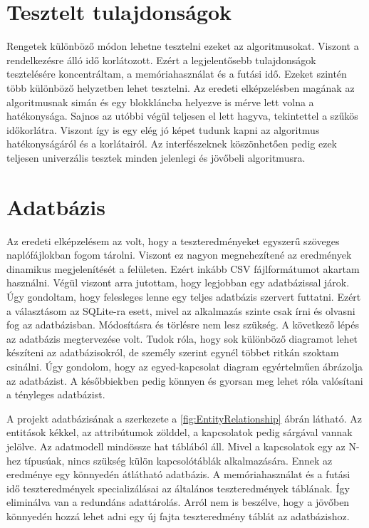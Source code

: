 \documentclass[12pt]{report} %
\begin{document}
\section{Tesztelt tulajdonságok} %

Rengetek különböző módon lehetne tesztelni ezeket az algoritmusokat. Viszont a rendelkezésre álló idő korlátozott. Ezért a legjelentősebb tulajdonságok tesztelésére koncentráltam, a memóriahasználat és a futási idő. Ezeket szintén több különböző helyzetben lehet tesztelni. Az eredeti elképzelésben magának az algoritmusnak simán és egy blokkláncba helyezve is mérve lett volna a hatékonysága. Sajnos az utóbbi végül teljesen el lett hagyva, tekintettel a szűkös időkorlátra. Viszont így is egy elég jó képet tudunk kapni az algoritmus hatékonyságáról és a korlátairól. Az interfészeknek köszönhetően pedig ezek teljesen univerzális tesztek minden jelenlegi és jövőbeli algoritmusra.

\section{Adatbázis} %

Az eredeti elképzelésem az volt, hogy a teszteredményeket egyszerű szöveges naplófájlokban fogom tárolni. Viszont ez nagyon megnehezítené az eredmények dinamikus megjelenítését a felületen. Ezért inkább CSV fájlformátumot akartam használni. Végül viszont arra jutottam, hogy legjobban egy adatbázissal járok. Úgy gondoltam, hogy felesleges lenne egy teljes adatbázis szervert futtatni. Ezért a választásom az SQLite-ra \cite{sqLite} esett, mivel az alkalmazás szinte csak írni és olvasni fog az adatbázisban. Módosításra és törlésre nem lesz szükség. A következő lépés az adatbázis megtervezése volt. Tudok róla, hogy sok különböző diagramot lehet készíteni az adatbázisokról, de személy szerint egynél többet ritkán szoktam csinálni. Úgy gondolom, hogy az egyed-kapcsolat diagram egyértelműen ábrázolja az adatbázist. A későbbiekben pedig könnyen és gyorsan meg lehet róla valósítani a tényleges adatbázist.

A projekt adatbázisának a szerkezete a \ref{fig:EntityRelationship} ábrán látható. Az entitások kékkel, az attribútumok zölddel, a kapcsolatok pedig sárgával vannak jelölve. Az adatmodell mindössze hat táblából áll. Mivel a kapcsolatok egy az N-hez típusúak, nincs szükség külön kapcsolótáblák alkalmazására. Ennek az eredménye egy könnyedén átlátható adatbázis. A memóriahasználat és a futási idő teszteredmények specializálásai az általános teszteredmények táblának. Így eliminálva van a redundáns adattárolás. Arról nem is beszélve, hogy a jövőben könnyedén hozzá lehet adni egy új fajta teszteredmény táblát az adatbázishoz.
\end{document}
